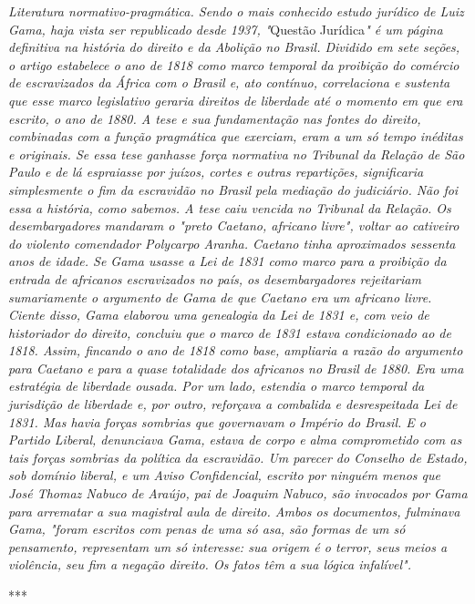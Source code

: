 \emph{Literatura normativo-pragmática. Sendo o mais conhecido estudo
jurídico de Luiz Gama, haja vista ser republicado desde 1937, "}Questão
Jurídica\emph{" é um página definitiva na história do direito e da
Abolição no Brasil. Dividido em sete seções, o artigo estabelece o ano
de 1818 como marco temporal da proibição do comércio de escravizados da
África com o Brasil e, ato contínuo, correlaciona e sustenta que esse
marco legislativo geraria direitos de liberdade até o momento em que era
escrito, o ano de 1880. A tese e sua fundamentação nas fontes do
direito, combinadas com a função pragmática que exerciam, eram a um só
tempo inéditas e originais. Se essa tese ganhasse força normativa no
Tribunal da Relação de São Paulo e de lá espraiasse por juízos, cortes e
outras repartições, significaria simplesmente o fim da escravidão no
Brasil pela mediação do judiciário. Não foi essa a história, como
sabemos. A tese caiu vencida no Tribunal da Relação. Os desembargadores
mandaram o "preto Caetano, africano livre", voltar ao cativeiro do
violento comendador Polycarpo Aranha. Caetano tinha aproximados sessenta
anos de idade. Se Gama usasse a Lei de 1831 como marco para a proibição
da entrada de africanos escravizados no país, os desembargadores
rejeitariam sumariamente o argumento de Gama de que Caetano era um
africano livre. Ciente disso, Gama elaborou uma genealogia da Lei de
1831 e, com veio de historiador do direito, concluiu que o marco de 1831
estava condicionado ao de 1818. Assim, fincando o ano de 1818 como base,
ampliaria a razão do argumento para Caetano e para a quase totalidade
dos africanos no Brasil de 1880. Era uma estratégia de liberdade ousada.
Por um lado, estendia o marco temporal da jurisdição de liberdade e, por
outro, reforçava a combalida e desrespeitada Lei de 1831. Mas havia
forças sombrias que governavam o Império do Brasil. E o Partido Liberal,
denunciava Gama, estava de corpo e alma comprometido com as tais forças
sombrias da política da escravidão. Um parecer do Conselho de Estado,
sob domínio liberal, e um Aviso Confidencial, escrito por ninguém menos
que José Thomaz Nabuco de Araújo, pai de Joaquim Nabuco, são invocados
por Gama para arrematar a sua magistral aula de direito. Ambos os
documentos, fulminava Gama, "foram escritos com penas de uma só asa, são
formas de um só pensamento, representam um só interesse: sua origem é o
terror, seus meios a violência, seu fim a negação direito. Os fatos têm
a sua lógica infalível". }

***

